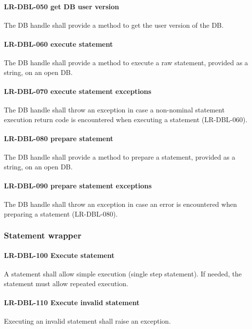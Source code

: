 \paragraph{LR-DBL-050 get DB user version}
The DB handle shall provide a method to get the user version of the DB.

\paragraph{LR-DBL-060 execute statement}
The DB handle shall provide a method to execute a raw statement, provided
as a string, on an open DB.

\paragraph{LR-DBL-070 execute statement exceptions}
The DB handle shall throw an exception in case a non-nominal statement
execution return code is encountered when executing a statement (LR-DBL-060).

\paragraph{LR-DBL-080 prepare statement}
The DB handle shall provide a method to prepare a statement, provided
as a string, on an open DB.

\paragraph{LR-DBL-090 prepare statement exceptions}
The DB handle shall throw an exception in case an error is encountered when
preparing a statement (LR-DBL-080).

\subsubsection{Statement wrapper}
\paragraph{LR-DBL-100 Execute statement}
A statement shall allow simple execution (single step statement). If needed, the
statement must allow repeated execution.

\paragraph{LR-DBL-110 Execute invalid statement}
Executing an invalid statement shall raise an exception.

